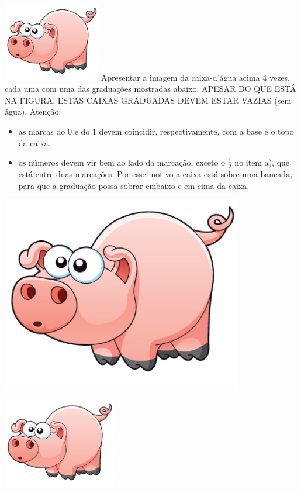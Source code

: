 \documentclass[a4,12pt]{book}
\begin{document}
\begin{imagem*}[breakable]{}{}
    \includegraphics[width=120pt, keepaspectratio]{pig}
  Apresentar a imagem da caixa-d'água acima 4 vezes, cada uma com uma das graduações mostradas abaixo. APESAR DO QUE ESTÁ NA FIGURA, ESTAS CAIXAS GRADUADAS DEVEM ESTAR VAZIAS (sem água).
  Atenção:
\begin{itemize} %
    \item       as marcas do 0 e do 1 devem coincidir, respectivamente, com a base e o topo da caixa.
    \item       os números devem vir bem ao lado da marcação, exceto o       $\frac{1}{2}$       no item a), que está entre duas marcações. Por esse motivo a caixa está sobre uma bancada, para que a graduação possa sobrar embaixo e em cima da caixa.
\end{itemize} %

    \includegraphics[width=300pt, keepaspectratio]{pig}
\end{imagem*}





\includegraphics[width=\textwidth,height=4cm, keepaspectratio]{pig}
\end{document}
